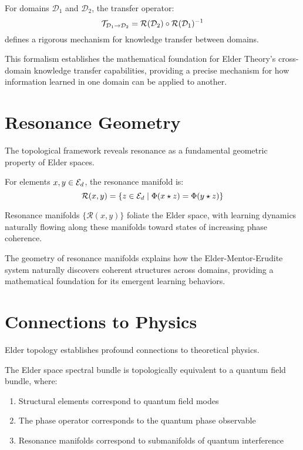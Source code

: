 \begin{corollary}
For domains $\mathcal{D}_1$ and $\mathcal{D}_2$, the transfer operator:
\begin{equation}
\mathcal{T}_{\mathcal{D}_1 \rightarrow \mathcal{D}_2} = \mathcal{R}(\mathcal{D}_2) \circ \mathcal{R}(\mathcal{D}_1)^{-1}
\end{equation}
defines a rigorous mechanism for knowledge transfer between domains.
\end{corollary}

This formalism establishes the mathematical foundation for Elder Theory's cross-domain knowledge transfer capabilities, providing a precise mechanism for how information learned in one domain can be applied to another.

\section{Resonance Geometry}

The topological framework reveals resonance as a fundamental geometric property of Elder spaces.

\begin{definition}
For elements $x, y \in \mathcal{E}_{d}$, the resonance manifold is:
\begin{equation}
\mathcal{R}(x, y) = \{z \in \mathcal{E}_{d} \mid \Phi(x \star z) = \Phi(y \star z)\}
\end{equation}
\end{definition}

\begin{theorem}
Resonance manifolds $\{\mathcal{R}(x, y)\}$ foliate the Elder space, with learning dynamics naturally flowing along these manifolds toward states of increasing phase coherence.
\end{theorem}

The geometry of resonance manifolds explains how the Elder-Mentor-Erudite system naturally discovers coherent structures across domains, providing a mathematical foundation for its emergent learning behaviors.

\section{Connections to Physics}

Elder topology establishes profound connections to theoretical physics.

\begin{theorem}
The Elder space spectral bundle is topologically equivalent to a quantum field bundle, where:
\begin{enumerate}
    \item Structural elements correspond to quantum field modes
    \item The phase operator corresponds to the quantum phase observable
    \item Resonance manifolds correspond to submanifolds of quantum interference
\end{enumerate}
\end{theorem}

